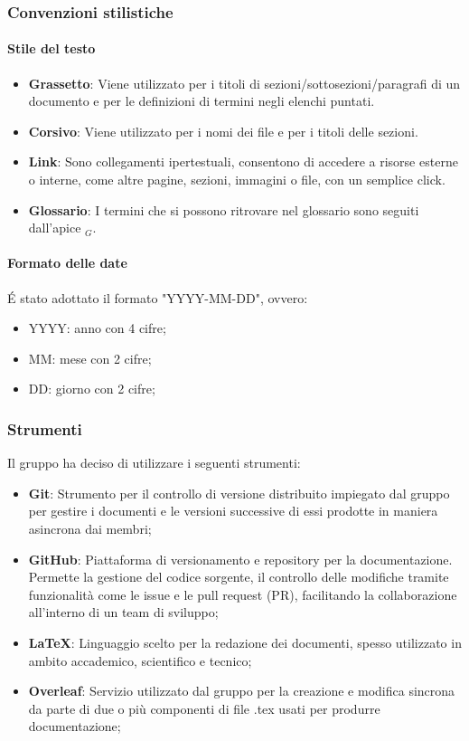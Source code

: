 \documentclass[10pt]{article}
\begin{document}
\begin{justify}
    \subsubsection{Convenzioni stilistiche}
        \paragraph{Stile del testo}
        \begin{itemize}
            \item \textbf{Grassetto}: Viene utilizzato per i titoli di sezioni/sottosezioni/paragrafi di un documento e per le definizioni di termini negli elenchi puntati.
            \item \textbf{Corsivo}: Viene utilizzato per i nomi dei file e per i titoli delle sezioni.
            \item \textbf{Link}: Sono collegamenti ipertestuali, consentono di accedere a risorse esterne o interne, come altre pagine, sezioni, immagini o file, con un semplice click.
            \item \textbf{Glossario}: I termini che si possono ritrovare nel glossario sono seguiti dall'apice $_G$.
        \end{itemize}

        \paragraph{Formato delle date}
        \'E stato adottato il formato "YYYY-MM-DD", ovvero:
        \begin{itemize}
            \item YYYY: anno con 4 cifre;
            \item MM: mese con 2 cifre;
            \item DD: giorno con 2 cifre;
        \end{itemize}

    \subsubsection{Strumenti}
    Il gruppo ha deciso di utilizzare i seguenti strumenti:
    \begin{itemize}
        \item \textbf{Git}: Strumento per il controllo di versione distribuito impiegato dal gruppo per gestire i documenti e le versioni successive di essi prodotte in maniera asincrona dai membri;
        \item \textbf{GitHub}: Piattaforma di versionamento e repository per la documentazione. Permette la gestione del codice sorgente, il controllo delle modifiche tramite funzionalità come le issue e le pull request (PR), facilitando la collaborazione all’interno di un team di sviluppo;
        \item \textbf{\LaTeX}: Linguaggio scelto per la redazione dei documenti, spesso utilizzato in ambito accademico, scientifico e tecnico;
        \item \textbf{Overleaf}: Servizio utilizzato dal gruppo per la creazione e modifica sincrona da parte di due o più componenti di file .tex usati per produrre documentazione;
    \end{itemize}


\end{justify}
\end{document}
